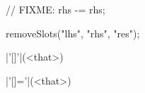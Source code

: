 \begin{urbiscriptapi}
\begin{urbiscript}
// FIXME: rhs -= rhs;
\end{urbiscript}
\begin{urbicomment}
  removeSlots("lhs", "rhs", "res");
\end{urbicomment}


\item|'[]'|(<that>)%
\begin{urbiassert}

\end{urbiassert}

\item|'[]='|(<that>)%
\begin{urbiassert}

\end{urbiassert}
\end{urbiscriptapi}


